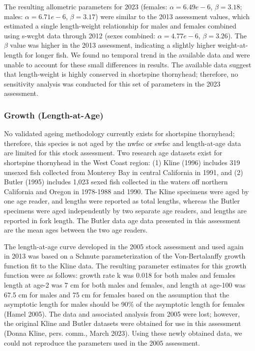 \documentclass[11pt,
  english,
  letterpaper,
]{article}
\begin{document}
The resulting allometric parameters for 2023 (females: \(\alpha = 6.49e-6\), \(\beta = 3.18\); males: \(\alpha = 6.71e-6\), \(\beta = 3.17\)) were similar to the 2013 assessment values, which estimated a single length-weight relationship for males and females combined using \gls{s-wcgbt} data through 2012 (sexes combined: \(\alpha = 4.77e-6\), \(\beta=3.26\)). The \(\beta\) value was higher in the 2013 assessment, indicating a slightly higher weight-at-length for longer fish. We found no temporal trend in the available data and were unable to account for these small differences in results. The available data suggest that length-weight is highly conserved in shortspine thornyhead; therefore, no sensitivity analysis was conducted for this set of parameters in the 2023 assessment.

\hypertarget{growth-length-at-age}{%
\subsubsection{Growth (Length-at-Age)}\label{growth-length-at-age}}

No validated ageing methodology currently exists for shortspine thornyhead; therefore, this species is not aged by the \gls{nwfsc} or \gls{swfsc} and length-at-age data are limited for this stock assessment. Two research age datasets exist for shortspine thornyhead in the West Coast region: (1) Kline (1996) includes 319 unsexed fish collected from Monterey Bay in central California in 1991, and (2) Butler (1995) includes 1,023 sexed fish collected in the waters off northern California and Oregon in 1978-1988 and 1990. The Kline specimens were aged by one age reader, and lengths were reported as total lengths, whereas the Butler specimens were aged independently by two separate age readers, and lengths are reported in fork length. The Butler data age data presented in this assessment are the mean ages between the two age readers.

The length-at-age curve developed in the 2005 stock assessment and used again in 2013 was based on a Schnute parameterization of the Von-Bertalanffy growth function fit to the Kline data. The resulting parameter estimates for this growth function were as follows: growth rate k was 0.018 for both males and females length at age-2 was 7 cm for both males and females, and length at age-100 was 67.5 cm for males and 75 cm for females based on the assumption that the asymptotic length for males should be 90\% of the asymptotic length for females (Hamel 2005). The data and associated analysis from 2005 were lost; however, the original Kline and Butler datasets were obtained for use in this assessment (Donna Kline, pers. comm., March 2023). Using these newly obtained data, we could not reproduce the parameters used in the 2005 assessment.
\end{document}
